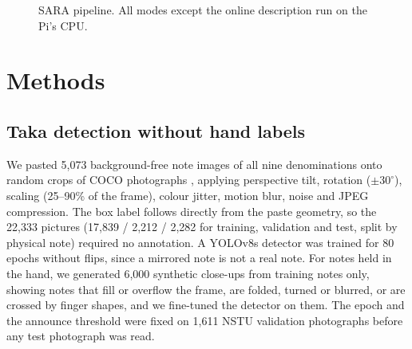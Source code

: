 \documentclass[conference]{IEEEtran}
\begin{document}
\begin{figure}[t]
\centering
{}
\caption{SARA pipeline. All modes except the online description run on the Pi's CPU.}
\label{fig:arch}
\end{figure}

\section{Methods}
\subsection{Taka detection without hand labels}
We pasted 5,073 background-free note images of all nine denominations \cite{banglataka} onto random crops of COCO photographs \cite{coco}, applying perspective tilt, rotation ($\pm30^\circ$), scaling (25--90\% of the frame), colour jitter, motion blur, noise and JPEG compression. The box label follows directly from the paste geometry, so the 22,333 pictures (17,839 / 2,212 / 2,282 for training, validation and test, split by physical note) required no annotation. A YOLOv8s detector was trained for 80 epochs without flips, since a mirrored note is not a real note. For notes held in the hand, we generated 6,000 synthetic close-ups from training notes only, showing notes that fill or overflow the frame, are folded, turned or blurred, or are crossed by finger shapes, and we fine-tuned the detector on them. The epoch and the announce threshold were fixed on 1,611 NSTU validation photographs before any test photograph was read.
\end{document}
